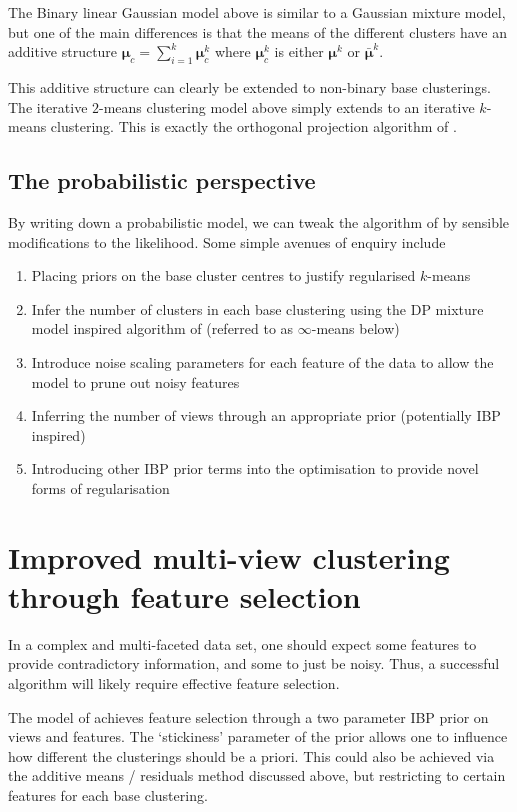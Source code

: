 \documentclass{article}
\numberwithin{equation}{section}
\numberwithin{thm}{section}
\def\centre{\boldsymbol{\mu}}
\begin{document}
The Binary linear Gaussian model above is similar to a Gaussian mixture model, but one of the main differences is that the means of the different clusters have an additive structure \ie $\centre_c = \sum_{i=1}^k \centre^k_c$ where $\centre^k_c$ is either $\centre^k$ or $\bar{\centre}^k$.

This additive structure can clearly be extended to non-binary base clusterings.
The iterative $2$-means clustering model above simply extends to an iterative $k$-means clustering.
This is exactly the orthogonal projection algorithm of \cite{Cui2007}.

\subsection{The probabilistic perspective}

By writing down a probabilistic model, we can tweak the algorithm of \cite{Cui2007} by sensible modifications to the likelihood.
Some simple avenues of enquiry include
\begin{enumerate}
\item Placing priors on the base cluster centres to justify regularised $k$-means \citep[e.g.][]{Sun2012}
\item Infer the number of clusters in each base clustering using the DP mixture model inspired algorithm of \cite{Kulis2012} (referred to as $\infty$-means below)
\item Introduce noise scaling parameters for each feature of the data to allow the model to prune out noisy features
\item Inferring the number of views through an appropriate prior (potentially IBP inspired)
\item Introducing other IBP prior terms into the optimisation to provide novel forms of regularisation
\end{enumerate}

\section{Improved multi-view clustering through feature selection}

In a complex and multi-faceted data set, one should expect some features to provide contradictory information, and some to just be noisy.
Thus, a successful algorithm will likely require effective feature selection.

The model of \citep{Niu2012} achieves feature selection through a two parameter IBP prior on views and features.
The `stickiness' parameter of the prior allows one to influence how different the clusterings should be a priori.
This could also be achieved via the additive means / residuals method discussed above, but restricting to certain features for each base clustering.
\end{document}
